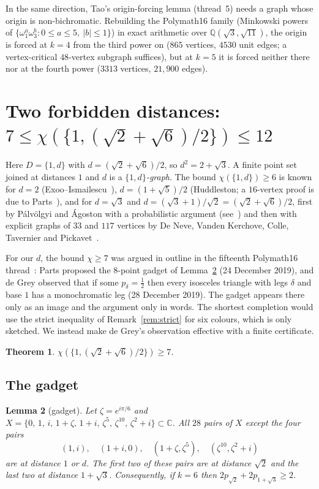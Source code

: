 \documentclass[11pt,a4paper]{amsart}
\newtheorem{theorem}{Theorem}[section]
\newtheorem{lemma}[theorem]{Lemma}
\theoremstyle{remark}
\newcommand{\Q}{\mathbb{Q}}
\begin{document}
In the same direction, Tao's origin-forcing lemma (thread~5) needs a graph whose origin is non-bichromatic. Rebuilding the Polymath16 family (Minkowski powers of $\{\omega_1^a\omega_3^b:0\le a\le5,\ |b|\le1\}$) in exact arithmetic over $\Q(\sqrt3,\sqrt{11})$, the origin is forced at $k=4$ from the third power on ($865$ vertices, $4530$ unit edges; a vertex-critical $48$-vertex subgraph suffices), but at $k=5$ it is forced neither there nor at the fourth power ($3313$ vertices, $21{,}900$ edges).

\section{Two forbidden distances: \texorpdfstring{$7\le\chi(\{1,(\sqrt2+\sqrt6)/2\})\le12$}{7 <= chi <= 12}}\label{sec:two}

Here $D=\{1,d\}$ with $d=(\sqrt2+\sqrt6)/2$, so $d^2=2+\sqrt3$. A finite point set joined at distances $1$ and $d$ is a \emph{$\{1,d\}$-graph}. The bound $\chi(\{1,d\})\ge6$ is known for $d=2$ (Exoo--Ismailescu~\cite{EI19}), $d=(1+\sqrt5)/2$ (Huddleston; a $16$-vertex proof is due to Parts~\cite{Pa20}), and for $d=\sqrt3$ and $d=(\sqrt3+1)/\sqrt2=(\sqrt2+\sqrt6)/2$, first by P\'alv\"olgyi and \'Agoston with a probabilistic argument (see~\cite{Pa20}) and then with explicit graphs of $33$ and $117$ vertices by De Neve, Vanden Kerchove, Colle, Tavernier and Pickavet~\cite{DN25}.

For our $d$, the bound $\chi\ge7$ was argued in outline in the fifteenth Polymath16 thread~\cite{PM15}: Parts proposed the $8$-point gadget of Lemma~\ref{lem:gadget} (24 December 2019), and de Grey observed that if some $p_\delta=\tfrac12$ then every isosceles triangle with legs $\delta$ and base $1$ has a monochromatic leg (28 December 2019). The gadget appears there only as an image and the argument only in words. The shortest completion would use the strict inequality of Remark~\ref{rem:strict} for six colours, which is only sketched. We instead make de Grey's observation effective with a finite certificate.

\begin{theorem}\label{thm:seven}
$\chi(\{1,(\sqrt2+\sqrt6)/2\})\ge7$.
\end{theorem}

\subsection{The gadget}

\begin{lemma}[gadget]\label{lem:gadget}
Let $\zeta=e^{i\pi/6}$ and $X=\{0,\,1,\,i,\,1+\zeta,\,1+i,\,\zeta^5,\,\zeta^{10},\,\zeta^2+i\}\subset\mathbb C$. All $28$ pairs of $X$ except the four pairs
\[
(1,i),\quad(1+i,0),\quad(1+\zeta,\zeta^5),\quad(\zeta^{10},\zeta^2+i)
\]
are at distance $1$ or $d$. The first two of these pairs are at distance $\sqrt2$ and the last two at distance $1+\sqrt3$. Consequently, if $k=6$ then $2p_{\sqrt2}+2p_{1+\sqrt3}\ge2$.
\end{lemma}
\end{document}
